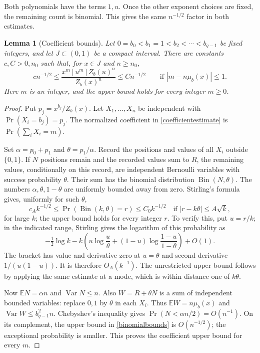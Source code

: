 \documentclass[12pt,a4paper]{article}
\newtheorem{lemma}[theorem]{Lemma}
\newcommand{\Var}{\operatorname{Var}}
\begin{document}
Both polynomials have the terms $1,u$. Once the other exponent choices are fixed, the remaining count is binomial. This gives the same $n^{-1/2}$ factor in both estimates.

\begin{lemma}[Coefficient bounds]\label{coefficients}
Let $0=b_0<b_1=1<b_2<\cdots<b_{q-1}$ be fixed integers, and let $J\subset(0,1)$ be a compact interval. There are constants $c,C>0,n_0$ such that, for $x\in J$ and $n\ge n_0$,
\begin{equation}\label{coefficientestimate}
c n^{-1/2}\le
\frac{x^m[u^m]Z_b(u)^n}{Z_b(x)^n}
\le C n^{-1/2}
\qquad\text{if }|m-n\mu_b(x)|\le1.
\end{equation}
Here $m$ is an integer, and the upper bound holds for every integer $m\ge0$.
\end{lemma}
\begin{proof}
Put $p_j=x^{b_j}/Z_b(x)$. Let $X_1,\ldots,X_n$ be independent with $\Pr(X_i=b_j)=p_j$. The normalized coefficient in \eqref{coefficientestimate} is $\Pr(\sum_iX_i=m)$.

Set $\alpha=p_0+p_1$ and $\theta=p_1/\alpha$. Record the positions and values of all $X_i$ outside $\{0,1\}$. If $N$ positions remain and the recorded values sum to $R$, the remaining values, conditionally on this record, are independent Bernoulli variables with success probability $\theta$. Their sum has the binomial distribution $\operatorname{Bin}(N,\theta)$.
The numbers $\alpha,\theta,1-\theta$ are uniformly bounded away from zero. Stirling's formula gives, uniformly for such $\theta$,
\begin{equation}\label{binomialbounds}
c_Ak^{-1/2}\le\Pr(\operatorname{Bin}(k,\theta)=r)\le C_0k^{-1/2}
\quad\text{if }|r-k\theta|\le A\sqrt k,
\end{equation}
for large $k$; the upper bound holds for every integer $r$. To verify this, put $u=r/k$; in the indicated range, Stirling gives the logarithm of this probability as
\[
-\tfrac12\log k-k\left(u\log\frac u\theta+(1-u)\log\frac{1-u}{1-\theta}\right)+O(1).
\]
The bracket has value and derivative zero at $u=\theta$ and second derivative $1/(u(1-u))$. It is therefore $O_A(k^{-1})$. The unrestricted upper bound follows by applying the same estimate at a mode, which is within distance one of $k\theta$.

Now $\mathbb E N=\alpha n$ and $\Var N\le n$. Also $W=R+\theta N$ is a sum of independent bounded variables: replace $0,1$ by $\theta$ in each $X_i$. Thus $\mathbb E W=n\mu_b(x)$ and $\Var W\le b_{q-1}^2n$. Chebyshev's inequality gives
$\Pr(N<\alpha n/2)=O(n^{-1})$.
On its complement, the upper bound in \eqref{binomialbounds} is $O(n^{-1/2})$; the exceptional probability is smaller. This proves the coefficient upper bound for every $m$.


\end{proof}
\end{document}
